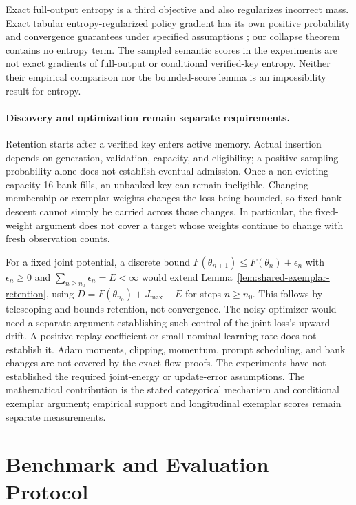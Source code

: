 \documentclass{article}
\newcommand{\1}{\mathbf 1}
\theoremstyle{remark}
\theoremstyle{definition}
\theoremstyle{plain}
\begin{document}
Exact full-output entropy is a third objective and also regularizes incorrect
mass. Exact tabular entropy-regularized policy gradient has its own positive
probability and convergence guarantees under specified assumptions
\citep{mei2020softmaxpg}; our collapse theorem contains no entropy term.
The sampled semantic scores in the experiments are not exact gradients of
full-output or conditional verified-key entropy. Neither their empirical
comparison nor the bounded-score lemma is an impossibility result for entropy.

\paragraph{Discovery and optimization remain separate requirements.}
Retention starts after a verified key enters active memory. Actual insertion
depends on generation, validation, capacity, and eligibility; a positive
sampling probability alone does not establish eventual admission. Once a
non-evicting capacity-16 bank fills, an unbanked key can remain ineligible.
Changing membership or exemplar weights changes the loss being bounded, so
fixed-bank descent cannot simply be carried across those changes. In
particular, the fixed-weight argument does not cover a target whose weights
continue to change with fresh observation counts.

For a fixed joint potential, a discrete bound
$F(\theta_{n+1})\le F(\theta_n)+\epsilon_n$ with
$\epsilon_n\ge0$ and $\sum_{n\ge n_0}\epsilon_n=E<\infty$ would extend
Lemma~\ref{lem:shared-exemplar-retention}, using
$D=F(\theta_{n_0})+J_{\max}+E$ for steps $n\ge n_0$.
This follows by telescoping and bounds retention, not convergence. The noisy
optimizer would need a separate argument establishing such control of the
joint loss's upward drift. A positive replay coefficient or small nominal
learning rate does not establish it. Adam moments, clipping, momentum, prompt
scheduling, and bank changes are not covered by the exact-flow proofs.
The experiments have not established the required joint-energy or
update-error assumptions. The mathematical contribution is the stated
categorical mechanism and conditional exemplar argument; empirical support
and longitudinal exemplar scores remain separate measurements.


\section{Benchmark and Evaluation Protocol}
\label{app:data}
\label{app:experimental-design}
\label{app:domain-overview}
\label{app:data-inventory}
\end{document}
